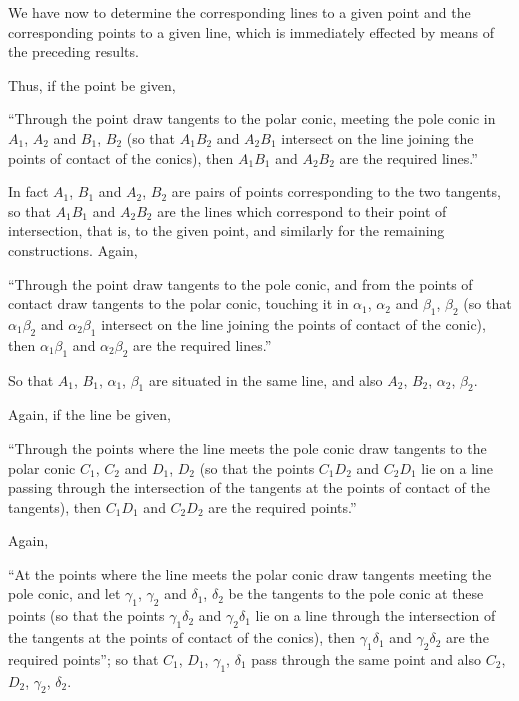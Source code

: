 \documentclass[11pt]{article}
\begin{document}
\medskip

We have now to determine the corresponding lines to a given point and the
corresponding points to a given line, which is immediately effected by means of the
preceding results.

\medskip

Thus, if the point be given,

\smallskip
``Through the point draw tangents to the polar conic, meeting the pole conic in
$A_{1}$, $A_{2}$ and $B_{1}$, $B_{2}$ (so that $A_{1}B_{2}$ and $A_{2}B_{1}$ intersect on the line joining the points
of contact of the conics), then $A_{1}B_{1}$ and $A_{2}B_{2}$ are the required lines.''

\smallskip
In fact $A_{1}$, $B_{1}$ and $A_{2}$, $B_{2}$ are pairs of points corresponding to the two tangents,
so that $A_{1}B_{1}$ and $A_{2}B_{2}$ are the lines which correspond to their point of intersection,
that is, to the given point, and similarly for the remaining constructions. Again,

\smallskip
``Through the point draw tangents to the pole conic, and from the points of
contact draw tangents to the polar conic, touching it in $\alpha_{1}$, $\alpha_{2}$ and $\beta_{1}$, $\beta_{2}$ (so that $\alpha_{1}\beta_{2}$
and $\alpha_{2}\beta_{1}$ intersect on the line joining the points of contact of the conic), then $\alpha_{1}\beta_{1}$
and $\alpha_{2}\beta_{2}$ are the required lines.''

\smallskip
So that $A_{1}$, $B_{1}$, $\alpha_{1}$, $\beta_{1}$ are situated in the same line, and also $A_{2}$, $B_{2}$, $\alpha_{2}$, $\beta_{2}$.

\medskip

Again, if the line be given,

\smallskip
``Through the points where the line meets the pole conic draw tangents to the
polar conic $C_{1}$, $C_{2}$ and $D_{1}$, $D_{2}$ (so that the points $C_{1}D_{2}$ and $C_{2}D_{1}$ lie on a line passing
through the intersection of the tangents at the points of contact of the tangents),
then $C_{1}D_{1}$ and $C_{2}D_{2}$ are the required points.''

\smallskip
Again,

\smallskip
``At the points where the line meets the polar conic draw tangents meeting the
pole conic, and let $\gamma_{1}$, $\gamma_{2}$ and $\delta_{1}$, $\delta_{2}$ be the tangents to the pole conic at these points
(so that the points $\gamma_{1}\delta_{2}$ and $\gamma_{2}\delta_{1}$ lie on a line through the intersection of the tangents
at the points of contact of the conics), then $\gamma_{1}\delta_{1}$ and $\gamma_{2}\delta_{2}$ are the required points'';
so that $C_{1}$, $D_{1}$, $\gamma_{1}$, $\delta_{1}$ pass through the same point and also $C_{2}$, $D_{2}$, $\gamma_{2}$, $\delta_{2}$.
\end{document}
